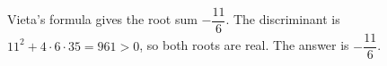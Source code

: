 Vieta's formula gives the root sum $-\dfrac{11}{6}$. The discriminant is $11^2+4\cdot6\cdot35=961>0$, so both roots are real. The answer is $\boxed{-\dfrac{11}{6}}$.

